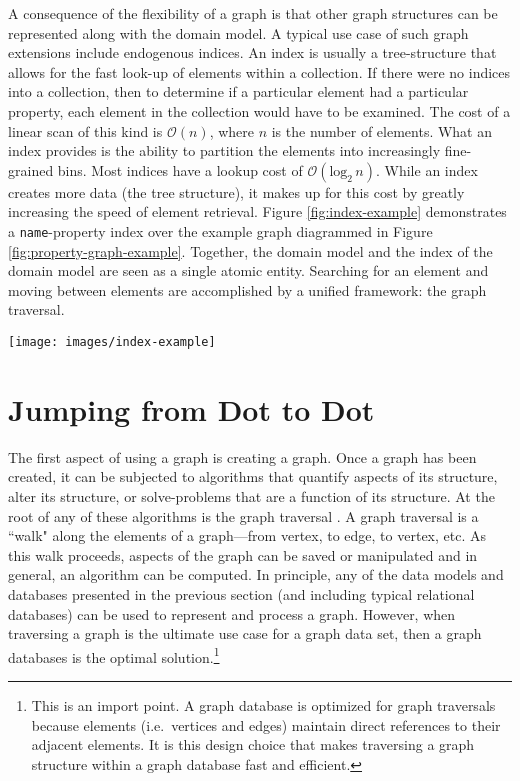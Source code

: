 \documentclass{svmult}
\newcommand{\ttt}{\texttt}
\newcommand{\mca}{\mathcal}
\begin{document}
A consequence of the flexibility of a graph is that other graph structures can be represented along with the domain model. A typical use case of such graph extensions include endogenous indices. An index is usually a tree-structure that allows for the fast look-up of elements within a collection. If there were no indices into a collection, then to determine if a particular element had a particular property, each element in the collection would have to be examined. The cost of a linear scan of this kind is $\mca{O}(n)$, where $n$ is the number of elements. What an index provides is the ability to partition the elements into increasingly fine-grained bins. Most indices have a lookup cost of $\mca{O}(\text{log}_2 \, n)$. While an index creates more data (the tree structure), it makes up for this cost by greatly increasing the speed of element retrieval. Figure \ref{fig:index-example} demonstrates a \ttt{name}-property index over the example graph diagrammed in Figure \ref{fig:property-graph-example}. Together, the domain model and the index of the domain model are seen as a single atomic entity. Searching for an element and moving between elements are accomplished by a unified framework: the graph traversal.
\begin{figure*}[h!]
	\centering
		\texttt{[image: images/index-example]}
	\caption{\label{fig:index-example}The index of the attributes/properties of the vertices and edges tend to be trees. A graph is a generalization of a tree. As such, graph databases allow for the modeling of the indices of the graph within the graph structure itself. For the sake of diagram clarity, the index does not touch every vertex with a \ttt{name} property. Finally, the edge labels of the index tree denote the ``bin'' that each sub-vertex is representing.}
\end{figure*}

\section{Jumping from Dot to Dot}

The first aspect of using a graph is creating a graph. Once a graph has been created, it can be subjected to algorithms that quantify aspects of its structure, alter its structure, or solve-problems that are a function of its structure. At the root of any of these algorithms is the graph traversal \cite{traversal:rodriguez2010}. A graph traversal is a ``walk" along the elements of a graph---from vertex, to edge, to vertex, etc. As this walk proceeds, aspects of the graph can be saved or manipulated and in general, an algorithm can be computed. In principle, any of the data models and databases presented in the previous section (and including typical relational databases) can be used to represent and process a graph. However, when traversing a graph is the ultimate use case for a graph data set, then a graph databases is the optimal solution.\footnote{This is an import point. A graph database is optimized for graph traversals because elements (i.e.~vertices and edges) maintain direct references to their adjacent elements. It is this design choice that makes traversing a graph structure within a graph database fast and efficient.}
\end{document}
